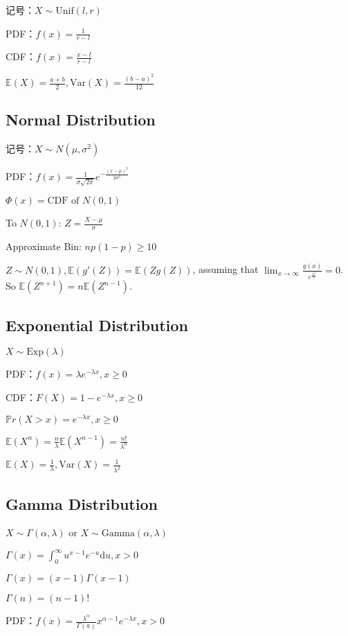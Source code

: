 \documentclass[9pt,landscape]{article}
\begin{document}
\begin{multicols}{3}
记号：$X \sim \mathrm{Unif}(l, r)$

PDF：$f(x)=\frac{1}{r-l}$

CDF：$f(x)=\frac{x-l}{r-l}$

$\mathbb{E}(X)=\frac{a+b}{2}, \mathrm{Var}(X)=\frac{(b-a)^2}{12}$

\subsection{Normal Distribution}

记号：$X \sim N\left(\mu, \sigma^2\right)$

PDF：$f(x)=\frac{1}{\sigma\sqrt{2\pi}}e^{-\frac{\left(x-\mu\right)^2}{2\sigma^2}}$

$\Phi(x)=\text{CDF of $N(0, 1)$}$

To $N(0, 1)$: $Z = \frac{X - \mu}{\sigma}$

Approximate Bin: $np(1-p)\ge 10$

$Z\sim N(0, 1), \mathbb{E}(g'(Z))=\mathbb{E}(Zg(Z))$,  assuming that $\lim_{x\to \infty}\frac{g(x)}{e^{\frac{x^2}{2}}}=0$. So $\mathbb{E}(Z^{n+1})=n\mathbb{E}(Z^{n-1})$.

\subsection{Exponential Distribution}

$X\sim \mathrm{Exp}(\lambda)$

PDF：$f(x)=\lambda e^{-\lambda x}, x\ge 0$

CDF：$F(X)=1-e^{-\lambda x}, x\ge 0$

$\mathbb{P}r(X>x)=e^{-\lambda x}, x\ge 0$

$\mathbb{E}(X^n)=\frac{n}{\lambda}\mathbb{E}(X^{n-1})=\frac{n!}{\lambda^n}$

$\mathbb{E}(X)=\frac{1}{\lambda}, \mathrm{Var}(X)=\frac{1}{\lambda^2}$

\subsection{Gamma Distribution}

$X\sim \Gamma(\alpha, \lambda)$ or $X\sim \mathrm{Gamma}(\alpha, \lambda)$

$\Gamma(x)=\int_{0}^{\infty}u^{x-1}e^{-u}\mathrm{d}u, x>0$

$\Gamma(x)=(x-1)\Gamma(x - 1)$

$\Gamma(n)=(n-1)!$

PDF：$f(x)=\frac{\lambda^\alpha}{\Gamma(a)}x^{\alpha - 1}e^{-\lambda x}, x>0$


\end{multicols}
\end{document}
